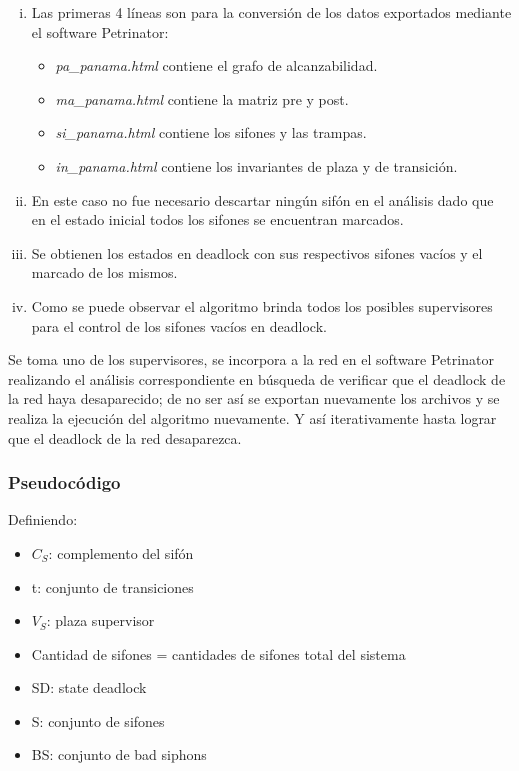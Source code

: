 \begin{enumerate}[i.]
    \item Las primeras 4 líneas son para la conversión de los datos exportados mediante el software Petrinator:
        \begin{itemize}
            \item \textit{pa\_panama.html} contiene el grafo de alcanzabilidad.
            \item \textit{ma\_panama.html} contiene la matriz pre y post.
            \item \textit{si\_panama.html} contiene los sifones y las trampas.
            \item \textit{in\_panama.html} contiene los invariantes de plaza y de transición.
        \end{itemize}
    
    \item En este caso no fue necesario descartar ningún sifón en el análisis dado que en el estado inicial todos los sifones se encuentran marcados. 
    
    \item Se obtienen los estados en deadlock con sus respectivos sifones vacíos y el marcado de los mismos.
    
    \item Como se puede observar el algoritmo brinda todos los posibles supervisores para el control de los sifones vacíos en deadlock. 
\end{enumerate}

Se toma uno de los supervisores, se incorpora a la red en el software Petrinator realizando el análisis correspondiente en búsqueda de verificar que el deadlock de la red haya desaparecido; de no ser así se exportan nuevamente los archivos y se realiza la ejecución del algoritmo nuevamente. Y así iterativamente hasta lograr que el deadlock de la red desaparezca.

\subsubsection{Pseudocódigo}
\noindent Definiendo:
\begin{itemize}
    \item $C_S$: complemento del sifón
    \item t: conjunto de transiciones
    \item $V_S$: plaza supervisor
    \item Cantidad de sifones = cantidades de sifones total del sistema
    \item SD: state deadlock
    \item S: conjunto de sifones
    \item BS: conjunto de bad siphons
\end{itemize}

